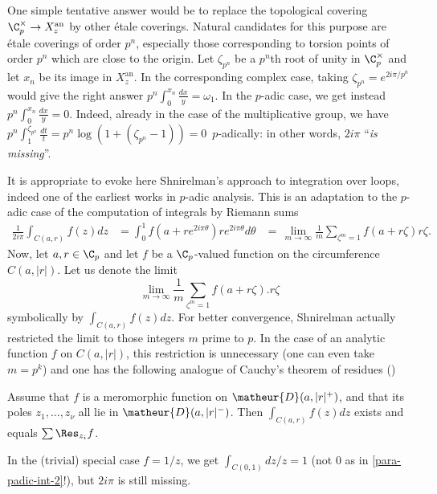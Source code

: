\begin{para}\label{para-padic-int-2}
 One simple tentative answer would be to replace the topological
 covering ${\C}_p^{\times}\rightarrow X_z^{\mathrm{an}}$ by other \'etale
 coverings. Natural candidates for this purpose are \'etale coverings of
 order $p^n$, especially those corresponding to torsion points of order
 $p^n$ which are close to the origin.  Let $\zeta_{p^n}$ be a $p^n$th
 root of unity in ${\C}_p^{\times}$ and let $x_n$ be its image in
 $X_z^{\mathrm{an}}$. In the corresponding complex case, taking
 $\zeta_{p^n}=e^{2i\pi/{p^n}}$ would give the right answer
 $p^n\int_{0}^{x_n}\frac{dx}{y}=\omega_1$.  In the $p$-adic case, we get
 instead $p^n\int_{0}^{x_n}\frac{dx}{y}=0$.  Indeed, already in the case
 of the multiplicative group, we have
 $p^n\int_{1}^{\zeta_{p^n}}\frac{dt}{t}=p^n \log(1+(\zeta_{p^n}-1))=0\,$  
 $p$-adically: in other words, $2i\pi$ ``\emph{is missing}''.
\end{para}

\begin{para}
 It is appropriate to evoke here Shnirel\-man's approach to integration over loops,
 indeed one of the earliest works in $p$-adic analysis. This
 is an adaptation to the $p$-adic case of the computation of integrals by
 Riemann sums
 \begin{align*}
  \frac{1}{2i\pi}\int_{C(a,r)} f(z)dz & = \int_0^1 f(a+re^{2i\pi\theta})
   re^{2i\pi \theta}d\theta
   & = \,\lim_{m\to \infty}\frac{1}{m}\sum_{\zeta^m=1}f(a+r\zeta) r\zeta.
 \end{align*}
 Now, let $a, r \in \C_p$ and let $f$ be a $\C_p$-valued function
 on the circumference
 $C(a,|r|)$.  Let us denote the limit
 \begin{equation*}
  \lim_{m\to \infty}\frac{1}{m}\sum_{\zeta^m=1} f(a+r\zeta).r\zeta 
 \end{equation*}
 symbolically
 by $\int_{C(a,r)} f(z)dz$. For better convergence, Shnirelman actually
 restricted the
 limit to those integers $m$ prime to $p$. In the case of an analytic
 function $f$ on $C(a,|r|)$, this restriction is unnecessary (one can even
 take $m=p^k$) and one has the following analogue
 of Cauchy's theorem of residues (\cf \cite[app.]{paascorw})

 \begin{lem}
  Assume that $f$ is a meromorphic function on $\matheur{D}(a,|r|^+)$,
  and that its poles $z_1,\ldots, z_{\nu}$ all lie in
  $\matheur{D}(a,|r|^-)$. Then $\int_{C(a,r)} f(z)dz$ exists and equals
  $\sum \Res_{z_i} f$.
 \end{lem}

 In the (trivial) special case $f = 1/z$, we get
 $\int_{C(0,1)}dz/z =1$ (not $0$ as
 in \ref{para-padic-int-2}!), but $2i\pi$ is still missing.
\end{para}

